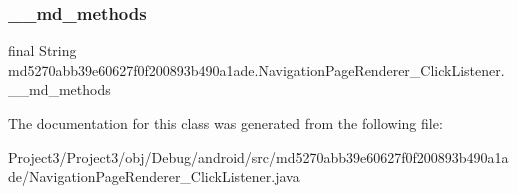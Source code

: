 \subsubsection{\texorpdfstring{\+\_\+\+\_\+md\+\_\+methods}{\_\_md\_methods}}
{\footnotesize\ttfamily final String md5270abb39e60627f0f200893b490a1ade.\+Navigation\+Page\+Renderer\+\_\+\+Click\+Listener.\+\_\+\+\_\+md\+\_\+methods\hspace{0.3cm}{\ttfamily [static]}}



The documentation for this class was generated from the following file\+:\begin{DoxyCompactItemize}
\item 
Project3/\+Project3/obj/\+Debug/android/src/md5270abb39e60627f0f200893b490a1ade/Navigation\+Page\+Renderer\+\_\+\+Click\+Listener.\+java\end{DoxyCompactItemize}
